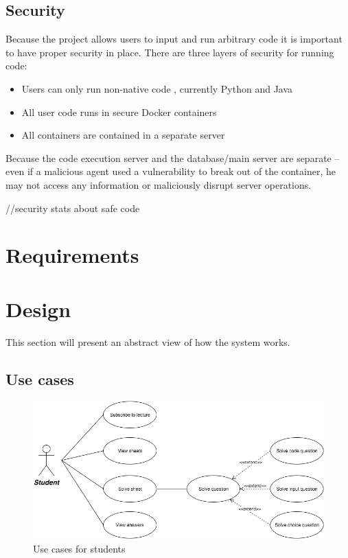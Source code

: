 \documentclass[12pt]{article}
\begin{document}
\subsection{Security}
Because the project allows users to input and run arbitrary code it is important to have proper security in place. There are three layers of security for running code:
\begin{itemize}
\item Users can only run non-native code , currently Python and Java
\item 	All user code runs in secure Docker containers
\item	All containers are contained in a separate server
\end{itemize}
Because the code execution server and the database/main server are separate – even if a malicious agent used a vulnerability to break out of the container, he may not access any information or maliciously disrupt server operations.

//security stats about safe code


\section{Requirements}
\section{Design}
This section will present an abstract view of how the system works.

\subsection{Use cases}
\begin{figure}[H]
  \centering

	\includegraphics[width=\textwidth,height=\textheight,keepaspectratio]{cases}
	\caption{Use cases for students}
\end{figure}
\end{document}
